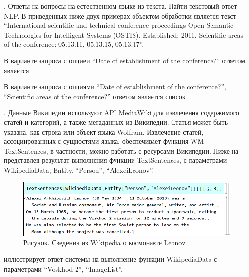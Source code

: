 .
Ответы на вопросы на естественном языке из текста. Найти текстовый ответ NLP. 
В приведенных ниже двух примерах объектом обработки является текст ``International scientific and technical conference proceedings Open Semantic Technologies for Intelligent Systems (OSTIS). Established: 2011. Scientific areas of the conference: 05.13.11, 05.13.15, 05.13.17''.

В варианте запроса с опцией ``Date of establishment of the conference?'' ответом является
\begin{center}
\end{center}
В варианте запроса с опциями ``Date of establishment of the conference?'', ``Scientific areas of the conference?'' ответом является список 
\begin{center}
\end{center}

.
Данные Википедии используют API MediaWiki для извлечения содержимого статей и категорий, а также метаданных из Википедии. Статья может быть указана, как строка или объект языка Wolfram. 
Извлечение статей, ассоциированных с сущностями языка, обеспечивает функция WM TextSentences, в частности, можно работать с ресурсами Википедии. 
Ниже на \textit{} представлен результат выполнения функции TextSentences, с параметрами WikipediaData, Entity, ``Person'', ``AlexeiLeonov''.
 
\begin{figure}[H]
	\includegraphics[scale=0.55]{images/part7/chapter_integration/integr_alg6.png}
	\caption{Рисунок. Сведения из Wikipedia о космонавте Leonov}
	\label{fig:integr_alg6}
\end{figure}

\textit{} иллюстрирует ответ системы на выполнение функции WikipediaData с параметрами ``Voskhod 2'', ``ImageList''.

